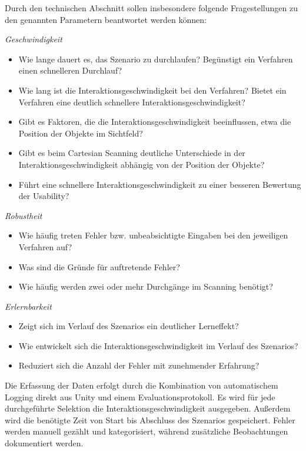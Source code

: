 Durch den technischen Abschnitt sollen insbesondere folgende Fragestellungen zu den genannten Parametern beantwortet werden können:


\textit{Geschwindigkeit} 
    \begin{itemize}
        \item Wie lange dauert es, das Szenario zu durchlaufen? Begünstigt ein Verfahren einen schnelleren Durchlauf?
        \item Wie lang ist die Interaktionsgeschwindigkeit bei den Verfahren? Bietet ein Verfahren eine deutlich schnellere Interaktionsgeschwindigkeit?
        \item Gibt es Faktoren, die die Interaktionsgeschwindigkeit beeinflussen, etwa die Position der Objekte im Sichtfeld?
        \item Gibt es beim Cartesian Scanning deutliche Unterschiede in der Interaktionsgeschwindigkeit abhängig von der Position der Objekte?
        \item Führt eine schnellere Interaktionsgeschwindigkeit zu einer besseren Bewertung der Usability? 
    \end{itemize}
\textit{Robustheit}
    \begin{itemize}
        \item  Wie häufig treten Fehler bzw. unbeabsichtigte Eingaben bei den jeweiligen Verfahren auf? 
        \item Was sind die Gründe für auftretende Fehler?
        \item Wie häufig werden zwei oder mehr Durchgänge im Scanning benötigt?
    \end{itemize}
\textit{Erlernbarkeit}
    \begin{itemize}
        \item Zeigt sich im Verlauf des Szenarios ein deutlicher Lerneffekt? 
        \item Wie entwickelt sich die Interaktionsgeschwindigkeit im Verlauf des Szenarios? 
        \item Reduziert sich die Anzahl der Fehler mit zunehmender Erfahrung?
    \end{itemize}


Die Erfassung der Daten erfolgt durch die Kombination von automatischem Logging direkt aus Unity und einem Evaluationsprotokoll. Es wird für jede durchgeführte Selektion die Interaktionsgeschwindigkeit ausgegeben. Außerdem wird die benötigte Zeit von Start bis Abschluss des Szenarios gespeichert. Fehler werden manuell gezählt und kategorisiert, während zusätzliche Beobachtungen dokumentiert werden. 


